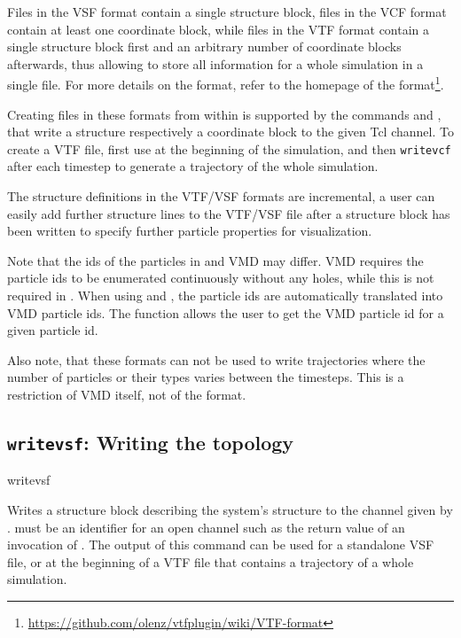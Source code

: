 Files in the VSF format contain a single structure block, files in the
VCF format contain at least one coordinate block, while files in the
VTF format contain a single structure block first and an arbitrary
number of coordinate blocks afterwards, thus allowing to store all
information for a whole simulation in a single file. For more details
on the format, refer to the homepage of the
format\footnote{\url{https://github.com/olenz/vtfplugin/wiki/VTF-format}}.

Creating files in these formats from within \es is supported by the
commands  and , that write a structure
respectively a coordinate block to the given Tcl channel. To create a
VTF file, first use  at the beginning of the simulation,
and then \texttt{writevcf} after each timestep to generate a
trajectory of the whole simulation.

The structure definitions in the VTF/VSF formats are incremental, \ie
a user can easily add further structure lines to the VTF/VSF file
after a structure block has been written to specify further particle
properties for visualization.

Note that the ids of the particles in \es and VMD may differ. VMD
requires the particle ids to be enumerated continuously without any
holes, while this is not required in \es. When using 
and , the \es particle ids are automatically translated
into VMD particle ids. The function  allows the user to
get the VMD particle id for a given \es particle id.

Also note, that these formats can not be used to write trajectories
where the number of particles or their types varies between the
timesteps. This is a restriction of VMD itself, not of the format.

\subsection{\texttt{writevsf}: Writing the topology}

\begin{essyntax}
  writevsf  
\end{essyntax}
Writes a structure block describing the system's structure to the
channel given by .  must be an
identifier for an open channel such as the return value of an
invocation of .  The output of this command can be used
for a standalone VSF file, or at the beginning of a VTF file that
contains a trajectory of a whole simulation.


